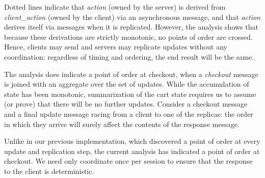 Dotted lines indicate that 
\emph{action} (owned by the server) is derived from \emph{client\_action} 
(owned by the client) via an asynchronous message, and that \emph{action} 
derives itself via messages when it is replicated.  However, the analysis
shows that because these derivations are strictly monotonic, no points of
order are crossed.  Hence, clients may send and servers may replicate 
updates without any coordination: regardless of timing and ordering, the end
result will be the same.

The analysis does indicate a point of order at checkout, when a \emph{checkout}
message is joined with an aggregate over the set of updates.  While the 
accumulation of state has been monotonic, summarization of the cart state
requires us to assume (or prove) that there will be no further updates.
Consider a checkout message and a final update message racing from a client
to one of the replicas: the order in which they arrive will surely affect
the contents of the response message.  

Unlike in our previous implementation, which discovered a point of order at
every update and replication step, the current analysis has indicated
a point of order at checkout.  We need only coordinate once per session to
ensure that the response to the client is deterministic.


